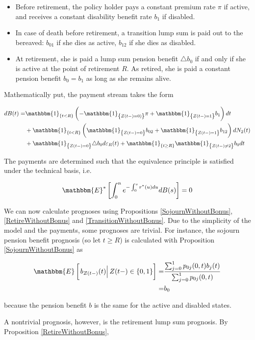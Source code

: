 \documentclass{book}
\newcommand{\1}[1]{\mathbbm{1}_{\left\lbrace #1 \right\rbrace}}
\newcommand{\econd}[2][def]{\mathbbm{E} \left[ \left. #1 \right| #2 \right]}
\newcommand{\expecStar}[1][def]{\mathbbm{E}^* \left[ #1 \right]}
\theoremstyle{break}
\theoremstyle{remark}
\numberwithin{equation}{section}
\begin{document}
\begin{example}
\begin{itemize}
    \item Before retirement, the policy holder pays a constant premium rate $\pi$ if active, and receives a constant disability benefit rate $b_1$ if disabled.
    \item In case of death before retirement, a transition lump sum is paid out to the bereaved: $b_{01}$ if she dies as active, $b_{12}$ if she dies as disabled.
    \item At retirement, she is paid a lump sum pension benefit $\triangle b_0$ if and only if she is active at the point of retirement $R$. As retired, she is paid a constant pension benefit $b_0=b_1$ as long as she remains alive.
\end{itemize}

Mathematically put, the payment stream takes the form

\begin{align*}
    dB(t) =& \1{t<R} \left( - \1{Z(t-)=0)} \pi + \1{Z(t-)=1} b_1 \right) dt \\
    &+ \1{t<R} \left( \1{Z(t-)=0} b_{02} + \1{Z(t-)=1} b_{12} \right) dN_2(t) \\
    &+ \1{Z(t-)=0} \triangle b_0 d \varepsilon_R(t) + \1{t \geq R} \1{Z(t-) \neq 2} b_0dt
\end{align*}

The payments are determined such that the equivalence principle is satisfied under the technical basis, i.e.

\begin{align*}
    \expecStar[\int_0^n e^{-\int_0^s r^*(u)du} dB(s)] = 0
\end{align*}

We can now calculate prognoses using Propositions \ref{SojournWithoutBonus}, \ref{RetireWithoutBonus} and \ref{TransitionWithoutBonus}. Due to the simplicity of the model and the payments, some prognoses are trivial. For instance, the sojourn pension benefit prognosis (so let $t \geq R$) is calculated with Proposition \ref{SojournWithoutBonus} as

\begin{align*}
    \econd[b_{Z(t-)} (t)]{Z(t-) \in \{ 0,1 \}} =& \frac{\sum_{j = 0}^1 p_{0j}(0,t) b_j(t)}{\sum_{j = 0}^1 p_{0j}(0,t)} \\
    =& b_0
\end{align*}

because the pension benefit $b$ is the same for the active and disabled states.

A nontrivial prognosis, however, is the retirement lump sum prognosis. By Proposition \ref{RetireWithoutBonus},


\end{example}
\end{document}
